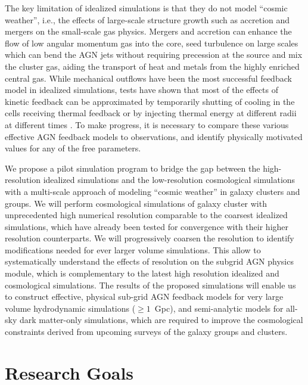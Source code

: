 \documentclass[letterpaper,11pt]{article}
\begin{document}
The key limitation of idealized simulations is that they do not model ``cosmic weather'', i.e., the effects of large-scale structure growth such as accretion and mergers on the small-scale gas physics. Mergers and accretion can enhance the flow of low angular momentum gas into the core, seed turbulence on large scales which can bend the AGN jets without requiring precession at the source \citep{Tremmel2018} %
and mix the cluster gas, aiding the transport of heat and metals from the highly enriched central gas. While mechanical outflows have been the most successful feedback model in idealized simulations, tests have shown that most of the effects of kinetic feedback can be approximated by temporarily shutting of cooling in the cells receiving thermal feedback \citep{Smith2017} or by injecting thermal energy at different radii at different times \citep{Vazza2013}. To make progress, it is necessary to compare these various effective AGN feedback models to observations, and identify physically motivated values for any of the free parameters.

We propose a pilot simulation program to bridge the gap between the high-resolution idealized simulations and the low-resolution cosmological simulations with a multi-scale approach of modeling ``cosmic weather'' in galaxy clusters and groups. We will perform cosmological simulations of galaxy cluster with unprecedented high numerical resolution comparable to the coarsest idealized simulations, which have already been tested for convergence with their higher resolution counterparts. We will progressively coarsen the resolution to identify modifications needed for ever larger volume simulations. 
This allow to systematically understand the effects of resolution on the subgrid AGN physics module, which is complementary to the latest high resolution idealized and cosmological simulations. 
The results of the proposed simulations will enable us to construct effective, physical sub-grid AGN feedback models for very large volume hydrodynamic simulations ($\geq 1$~Gpc), and semi-analytic models for all-sky dark matter-only simulations, which are required to improve the cosmological constraints derived from upcoming surveys of the galaxy groups and clusters.
\section{Research Goals}
\end{document}
